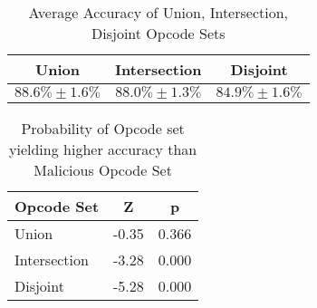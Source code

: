 
\begin{table}[H]
    \begin{center}
        \captionsetup{justification=centering}
        \caption{Average Accuracy of Union, Intersection, Disjoint Opcode Sets}
        \begin{tabular}{c|c|c}
            \textbf{Union} & \textbf{Intersection} & \textbf{Disjoint}\\
            \hline
            $88.6\% \pm 1.6\%$ & $88.0\% \pm 1.3\%$ & $84.9\% \pm 1.6\%$ \\
        \end{tabular}
        \label{tab:unionInterectionDisjoint}

    \end{center}
\end{table}

\begin{table}[H]
    \begin{center}
        \captionsetup{justification=centering}
        \caption{Probability of Opcode set yielding higher accuracy than Malicious Opcode Set}
        \begin{tabular}{l|S|S}
            \textbf{Opcode Set} & \textbf{Z} & \textbf{p}\\
            \hline
            Union & -0.35 & 0.366\\
            Intersection & -3.28 & 0.000\\
            Disjoint & -5.28 & 0.000\\
        \end{tabular}
        \label{tab:uidvsMalicious}
    \end{center}
\end{table}

